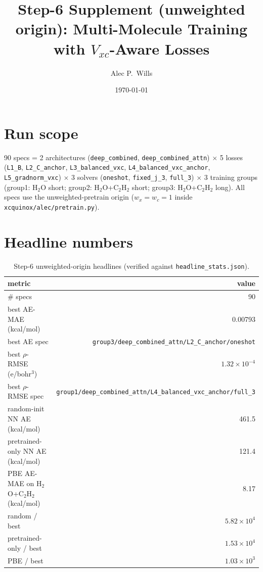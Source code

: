 \documentclass[11pt,letterpaper]{article}
\title{Step-6 Supplement (unweighted origin): Multi-Molecule Training with
  $V_{xc}$-Aware Losses}
\author{Alec P.\ Wills}
\date{\today}
\begin{document}
\maketitle

\section*{Run scope}
90 specs = 2 architectures (\texttt{deep\_combined}, \texttt{deep\_combined\_attn})
$\times$ 5 losses (\texttt{L1\_B}, \texttt{L2\_C\_anchor}, \texttt{L3\_balanced\_vxc},
\texttt{L4\_balanced\_vxc\_anchor}, \texttt{L5\_gradnorm\_vxc})
$\times$ 3 solvers (\texttt{oneshot}, \texttt{fixed\_j\_3}, \texttt{full\_3})
$\times$ 3 training groups (group1: H$_2$O short; group2: H$_2$O+C$_2$H$_2$ short;
group3: H$_2$O+C$_2$H$_2$ long). All specs use the unweighted-pretrain origin
($w_x \!=\! w_c \!=\! 1$ inside \texttt{xcquinox/alec/pretrain.py}).

\section{Headline numbers}

\begin{table}[h]
\centering
\caption{Step-6 unweighted-origin headlines (verified against
\texttt{headline\_stats.json}).}
\small
\begin{tabular}{lr}
\toprule
metric & value \\
\midrule
\# specs & 90 \\
best AE-MAE (kcal/mol) & 0.00793 \\
best AE spec & \texttt{group3/deep\_combined\_attn/L2\_C\_anchor/oneshot} \\
best $\rho$-RMSE (e/bohr$^3$) & $1.32\!\times\!10^{-4}$ \\
best $\rho$-RMSE spec & \texttt{group1/deep\_combined\_attn/L4\_balanced\_vxc\_anchor/full\_3} \\
random-init NN AE (kcal/mol) & 461.5 \\
pretrained-only NN AE (kcal/mol) & 121.4 \\
PBE AE-MAE on H$_2$O+C$_2$H$_2$ (kcal/mol) & 8.17 \\
random / best & $5.82\!\times\!10^{4}$ \\
pretrained-only / best & $1.53\!\times\!10^{4}$ \\
PBE / best & $1.03\!\times\!10^{3}$ \\
\bottomrule
\end{tabular}
\end{table}
\end{document}
